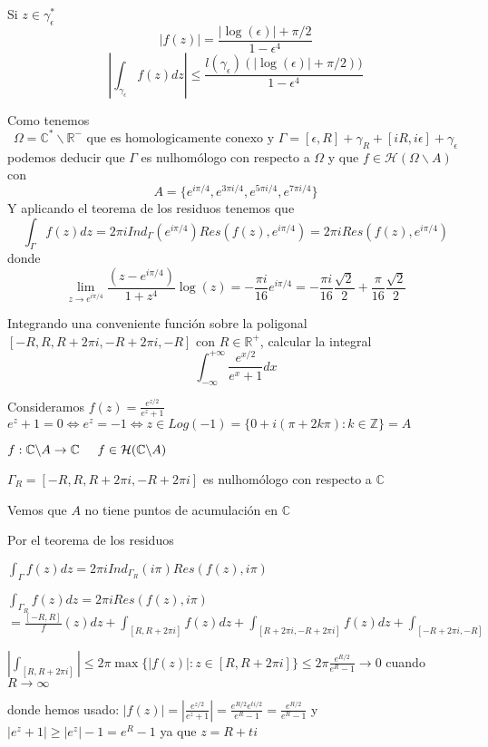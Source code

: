 Si $z\in\gamma_{\epsilon}^{\ast}$
$$ |f(z)| = \frac{|\log(\epsilon)|+\pi/2}{1-\epsilon^4} $$
$$ \left| \int_{\gamma_{\epsilon}} f(z)dz \right| \leq \frac{l(\gamma_{\epsilon}) (|\log(\epsilon)|+\pi/2))}{1-\epsilon^4}  $$

Como tenemos
$$ \Omega = \mathbb{C}^{\ast}\backslash\mathbb{R}^- \text{ que es homologicamente conexo y }\Gamma = [\epsilon,R] +\gamma_R + [iR,i\epsilon] +\gamma_{\epsilon} $$
podemos deducir que
$\Gamma$ es nulhomólogo con respecto a $\Omega$ y que $f\in\mathcal{H}(\Omega\backslash A)$
con
$$ A = \{ e^{i\pi/4}, e^{3\pi i/4}, e^{5\pi i/4}, e^{7\pi i/4} \} $$
Y aplicando el teorema de los residuos tenemos que
$$ \int_{\Gamma}f(z)dz = 2\pi i Ind_{\Gamma}(e^{i\pi/4}) Res(f(z),e^{i\pi/4}) = 2\pi i Res(f(z),e^{i\pi/4}) $$
donde
$$ \lim_{z\rightarrow e^{i\pi/4}} \frac{(z-e^{i\pi/4})}{1+z^4}\log(z) = -\frac{\pi i}{16}e^{i\pi/4} = -\frac{\pi i}{16}\frac{\sqrt{2}}{2} + \frac{\pi}{16}\frac{\sqrt{2}}{2} $$

\begin{ejer}
	Integrando una conveniente función sobre la poligonal $[-R,R,R+2\pi i,-R+2\pi i,-R]$ con $R\in\mathbb{R}^+$, calcular la integral
	$$ \int_{-\infty}^{+\infty} \frac{e^{x/2}}{e^x+1}dx $$
\end{ejer}
Consideramos 
$f(z) = \frac{e^{z/2}}{e^z+1}$
$e^z+1=0 \Longleftrightarrow e^z = -1 \Longleftrightarrow z\in Log(-1) = \{ 0+i(\pi+2k\pi) : k\in\mathbb{Z} \} = A$

$f : \mathbb{C}\backslash A \rightarrow \mathbb{C}\hspace{0.5cm} f\in\mathcal{H}(\mathbb{C}\backslash A)$

$\Gamma_R  = [-R,R,R+2\pi i, -R+2\pi i]$ es nulhomólogo con respecto a $\mathbb{C}$

Vemos que $A$ no tiene puntos de acumulación en $\mathbb{C}$

Por el teorema de los residuos

$\int_{\Gamma} f(z)dz = 2\pi i Ind_{\Gamma_R}(i\pi) Res(f(z),i\pi)$

$\int_{\Gamma_R} f(z)dz = 2\pi i Res(f(z),i\pi)$
$= \frac{[-R,R]} f(z)dz + \int_{[R,R+2\pi i]} f(z)dz + \int_{[R+2\pi i, -R+2\pi i]} f(z)dz + \int_{[-R+2\pi i, -R]}$


$\left| \int_{[R,R+2\pi i]} \right| \leq 2\pi\max\{ |f(z)| : z\in [R,R+2\pi i] \} \leq 2\pi \frac{e^{R/2}}{e^R-1} \rightarrow 0$ cuando $R\rightarrow \infty$

donde hemos usado:
$|f(z)| = |\frac{e^{z/2}}{e^z+1}| = \frac{e^{R/2} e^{ti/2}}{e^R-1} = \frac{e^{R/2}}{e^R-1}$
y
$|e^z+1| \geq |e^z|-1 = e^R-1$ ya que $z=R+ti$



